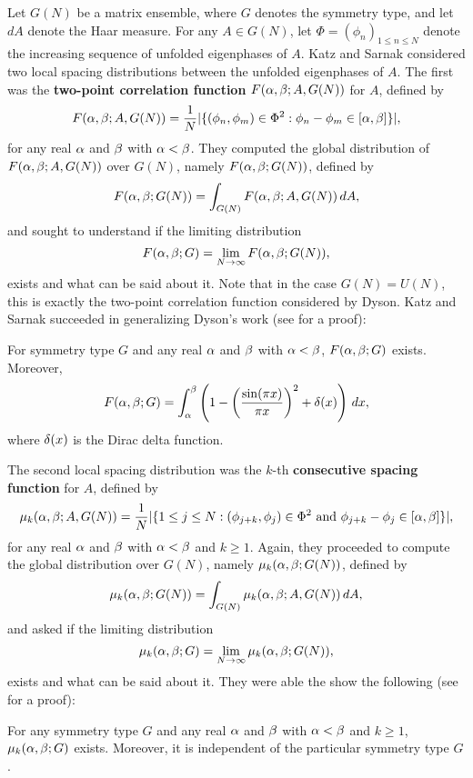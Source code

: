     Let $G(N)$ be a matrix ensemble, where $G$ denotes the symmetry type, and let $dA$ denote the Haar measure. For any $A \in G(N)$, let $\Phi = (\phi_{n})_{1 \le n \le N}$ denote the increasing sequence of unfolded eigenphases of $A$. Katz and Sarnak considered two local spacing distributions between the unfolded eigenphases of $A$. The first was the \textbf{two-point correlation function} $F(\alpha,\beta;A,G(N))$ for $A$, defined by
    \[
      F(\alpha,\beta;A,G(N)) = \frac{1}{N}|\{(\phi_{n},\phi_{m}) \in \Phi^{2}:\phi_{n}-\phi_{m} \in [\alpha,\beta]\}|,
    \]
    for any real $\alpha$ and $\beta$ with $\alpha < \beta$. They computed the global distribution of $F(\alpha,\beta;A,G(N))$ over $G(N)$, namely $F(\alpha,\beta;G(N))$, defined by
    \[
      F(\alpha,\beta;G(N)) = \int_{G(N)}F(\alpha,\beta;A,G(N))\,dA,
    \]
    and sought to understand if the limiting distribution
    \[
      F(\alpha,\beta;G) = \lim_{N \to \infty}F(\alpha,\beta;G(N)),
    \]
    exists and what can be said about it. Note that in the case $G(N) = U(N)$, this is exactly the two-point correlation function considered by Dyson. Katz and Sarnak succeeded in generalizing Dyson's work (see \cite{katz2023random} for a proof):

    \begin{proposition}\label{prop:Katz_Sarnak_limit_distribution_two_point}
      For symmetry type $G$ and any real $\alpha$ and $\beta$ with $\alpha < \beta$, $F(\alpha,\beta;G)$ exists. Moreover,
      \[
        F(\alpha,\beta;G) = \int_{\alpha}^{\beta}\left(1-\left(\frac{\sin(\pi x)}{\pi x}\right)^{2}+\delta(x)\right)\,dx,
      \]
      where $\delta(x)$ is the Dirac delta function.
    \end{proposition}

    The second local spacing distribution was the $k$-th \textbf{consecutive spacing function} for $A$, defined by
    \[
      \mu_{k}(\alpha,\beta;A,G(N)) = \frac{1}{N}|\{1 \le j \le N:\text{$(\phi_{j+k},\phi_{j}) \in \Phi^{2}$ and $\phi_{j+k}-\phi_{j} \in [\alpha,\beta]$}\}|,
    \]
    for any real $\alpha$ and $\beta$ with $\alpha < \beta$ and $k \ge 1$. Again, they proceeded to compute the global distribution over $G(N)$, namely $\mu_{k}(\alpha,\beta;G(N))$, defined by
    \[
      \mu_{k}(\alpha,\beta;G(N)) = \int_{G(N)}\mu_{k}(\alpha,\beta;A,G(N))\,dA,
    \]
    and asked if the limiting distribution
    \[
      \mu_{k}(\alpha,\beta;G) = \lim_{N \to \infty}\mu_{k}(\alpha,\beta;G(N)),
    \]
    exists and what can be said about it. They were able the show the following (see \cite{katz2023random} for a proof):

    \begin{proposition}\label{prop:Katz_Sarnak_limit_distribution_k_spacing}
      For any symmetry type $G$ and any real $\alpha$ and $\beta$ with $\alpha < \beta$ and $k \ge 1$, $\mu_{k}(\alpha,\beta;G)$ exists. Moreover, it is independent of the particular symmetry type $G$.
    \end{proposition}


